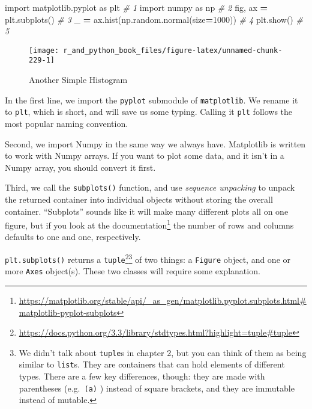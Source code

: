\documentclass[
  12pt,
  krantz2]{krantz}
\makeatletter
\newenvironment{Shaded}{\begin{snugshade}}{\end{snugshade}}
\newcommand{\CommentTok}[1]{\textcolor[rgb]{0.37,0.37,0.37}{\textit{#1}}}
\newcommand{\DecValTok}[1]{\textcolor[rgb]{0.06,0.06,0.06}{#1}}
\newcommand{\ImportTok}[1]{#1}
\newcommand{\NormalTok}[1]{#1}
\newcommand{\OperatorTok}[1]{\textcolor[rgb]{0.43,0.43,0.43}{\textbf{#1}}}
\renewcommand{\href}[2]{#2\footnote{\url{#1}}}
\newenvironment{kframe}{%
\medskip{}
\setlength{\fboxsep}{.8em}
 \def\at@end@of@kframe{}%
 \ifinner\ifhmode%
  \def\at@end@of@kframe{\end{minipage}}%
  \begin{minipage}{\columnwidth}%
 \fi\fi%
 \def\FrameCommand##1{\hskip\@totalleftmargin \hskip-\fboxsep
 \colorbox{shadecolor}{##1}\hskip-\fboxsep
     \hskip-\linewidth \hskip-\@totalleftmargin \hskip\columnwidth}%
 \MakeFramed {\advance\hsize-\width
   \@totalleftmargin\z@ \linewidth\hsize
   \@setminipage}}%
 {\par\unskip\endMakeFramed%
 \at@end@of@kframe}
\renewenvironment{Shaded}{\begin{kframe}}{\end{kframe}}
\makeatother
\begin{document}
\begin{Shaded}
\begin{Highlighting}[]
\ImportTok{import}\NormalTok{ matplotlib.pyplot }\ImportTok{as}\NormalTok{ plt       }\CommentTok{\# 1}
\ImportTok{import}\NormalTok{ numpy }\ImportTok{as}\NormalTok{ np                    }\CommentTok{\# 2}
\NormalTok{fig, ax }\OperatorTok{=}\NormalTok{ plt.subplots()              }\CommentTok{\# 3}
\NormalTok{\_ }\OperatorTok{=}\NormalTok{ ax.hist(np.random.normal(size}\OperatorTok{=}\DecValTok{1000}\NormalTok{))  }\CommentTok{\# 4}
\NormalTok{plt.show()                            }\CommentTok{\# 5}
\end{Highlighting}
\end{Shaded}

\begin{figure}

{\centering \texttt{[image: r\_and\_python\_book\_files/figure-latex/unnamed-chunk-229-1]} 

}

\caption{Another Simple Histogram}\label{fig:unnamed-chunk-229}
\end{figure}

In the first line, we import the \texttt{pyplot} submodule of \texttt{matplotlib}. We rename it to \texttt{plt}, which is short, and will save us some typing. Calling it \texttt{plt} follows the most popular naming convention.

Second, we import Numpy in the same way we always have. Matplotlib is written to work with Numpy arrays. If you want to plot some data, and it isn't in a Numpy array, you should convert it first.

Third, we call the \texttt{subplots()} function, and use \emph{sequence unpacking} to unpack the returned container into individual objects without storing the overall container. ``Subplots'' sounds like it will make many different plots all on one figure, but if you look at the \href{https://matplotlib.org/stable/api/_as_gen/matplotlib.pyplot.subplots.html\#matplotlib-pyplot-subplots}{documentation} the number of rows and columns defaults to one and one, respectively.

\texttt{plt.subplots()} returns a \href{https://docs.python.org/3.3/library/stdtypes.html?highlight=tuple\#tuple}{\texttt{tuple}}\footnote{We didn't talk about \texttt{tuple}s in chapter 2, but you can think of them as being similar to \texttt{list}s. They are containers that can hold elements of different types. There are a few key differences, though: they are made with parentheses (e.g.~\texttt{(\textquotesingle{}a\textquotesingle{})} ) instead of square brackets, and they are immutable instead of mutable.} of two things: a \texttt{Figure} object, and one or more \texttt{Axes} object(s). These two classes will require some explanation.
\end{document}
